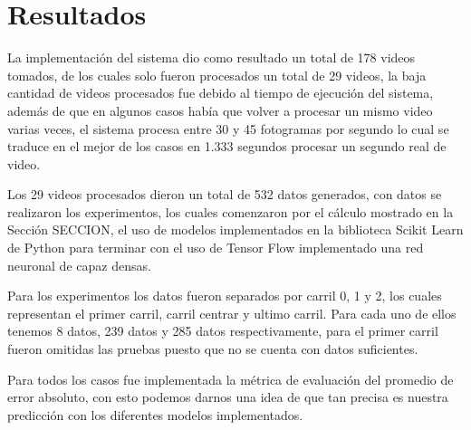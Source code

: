\chapter{Resultados}

La implementación del sistema dio como resultado un total de 178 videos tomados, de los cuales solo fueron procesados un total de 29 videos, la baja cantidad de videos procesados fue debido al tiempo de ejecución del sistema, además de que en algunos casos había que volver a procesar un mismo video varias veces, el sistema procesa entre 30 y 45 fotogramas por segundo lo cual se traduce en el mejor de los casos en 1.333 segundos procesar un segundo real de video.

Los 29 videos procesados dieron un total de 532 datos generados, con datos se realizaron los experimentos, los cuales comenzaron por el cálculo mostrado en la Sección SECCION, el uso de modelos implementados en la biblioteca Scikit Learn de Python para terminar con el uso de Tensor Flow implementado una red neuronal de capaz densas.

Para los experimentos los datos fueron separados por carril 0, 1 y 2, los cuales representan el primer carril, carril centrar y ultimo carril. Para cada uno de ellos tenemos 8 datos, 239 datos y 285 datos respectivamente, para el primer carril fueron omitidas las pruebas puesto que no se cuenta con datos suficientes.

Para todos los casos fue implementada la métrica de evaluación del promedio de error absoluto, con esto podemos darnos una idea de que tan precisa es nuestra predicción con los diferentes modelos implementados.






